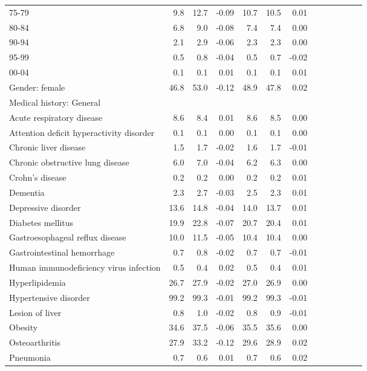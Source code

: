 \documentclass[11pt,]{article}
\begin{document}
\begin{longtable}{lrrrrrrrrrrrr}
      75-79 &  9.8 & 12.7 & -0.09 & 10.7 & 10.5 &  0.01 \\ 
      80-84 &  6.8 &  9.0 & -0.08 &  7.4 &  7.4 &  0.00 \\ 
      90-94 &  2.1 &  2.9 & -0.06 &  2.3 &  2.3 &  0.00 \\ 
      95-99 &  0.5 &  0.8 & -0.04 &  0.5 &  0.7 & -0.02 \\ 
      00-04 &  0.1 &  0.1 &  0.01 &  0.1 &  0.1 &  0.01 \\ 
  Gender: female & 46.8 & 53.0 & -0.12 & 48.9 & 47.8 &  0.02 \\ 
  Medical history: General &    &    &     &    &    &     \\ 
      Acute respiratory disease &  8.6 &  8.4 &  0.01 &  8.6 &  8.5 &  0.00 \\ 
      Attention deficit hyperactivity disorder &  0.1 &  0.1 &  0.00 &  0.1 &  0.1 &  0.00 \\ 
      Chronic liver disease &  1.5 &  1.7 & -0.02 &  1.6 &  1.7 & -0.01 \\ 
      Chronic obstructive lung disease &  6.0 &  7.0 & -0.04 &  6.2 &  6.3 &  0.00 \\ 
      Crohn's disease &  0.2 &  0.2 &  0.00 &  0.2 &  0.2 &  0.01 \\ 
      Dementia &  2.3 &  2.7 & -0.03 &  2.5 &  2.3 &  0.01 \\ 
      Depressive disorder & 13.6 & 14.8 & -0.04 & 14.0 & 13.7 &  0.01 \\ 
      Diabetes mellitus & 19.9 & 22.8 & -0.07 & 20.7 & 20.4 &  0.01 \\ 
      Gastroesophageal reflux disease & 10.0 & 11.5 & -0.05 & 10.4 & 10.4 &  0.00 \\ 
      Gastrointestinal hemorrhage &  0.7 &  0.8 & -0.02 &  0.7 &  0.7 & -0.01 \\ 
      Human immunodeficiency virus infection &  0.5 &  0.4 &  0.02 &  0.5 &  0.4 &  0.01 \\ 
      Hyperlipidemia & 26.7 & 27.9 & -0.02 & 27.0 & 26.9 &  0.00 \\ 
      Hypertensive disorder & 99.2 & 99.3 & -0.01 & 99.2 & 99.3 & -0.01 \\ 
      Lesion of liver &  0.8 &  1.0 & -0.02 &  0.8 &  0.9 & -0.01 \\ 
      Obesity & 34.6 & 37.5 & -0.06 & 35.5 & 35.6 &  0.00 \\ 
      Osteoarthritis & 27.9 & 33.2 & -0.12 & 29.6 & 28.9 &  0.02 \\ 
      Pneumonia &  0.7 &  0.6 &  0.01 &  0.7 &  0.6 &  0.02 \\ 

\end{longtable}
\end{document}
